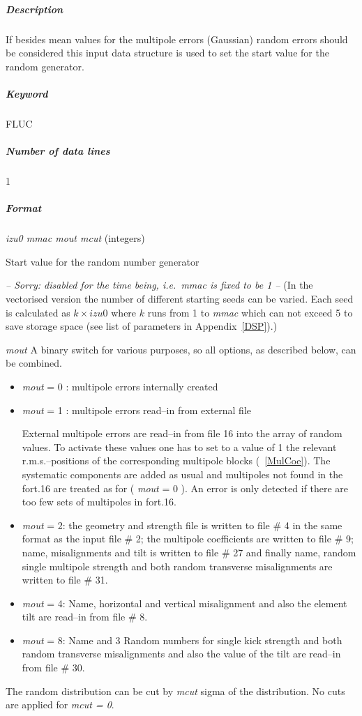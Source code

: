\subparagraph{Description} If besides mean values for the multipole
errors (Gaussian) random errors should be considered this input data
structure is used to set the start value for the random generator.

\subparagraph{Keyword} FLUC \subparagraph{Number of data lines} 1

\subparagraph{Format} {\em izu0 mmac mout mcut} \/(integers)
\begin{description}
\item [izu0] Start value for the random number generator
\item [mmac] {\em \large -- Sorry: disabled for the time being, i.e.\ 
    mmac is fixed to be 1 --} \/({\small In the vectorised version the
    number of different starting seeds can be varied.  Each seed is
    calculated as \mbox{$ k \times izu0 $} where $k$ runs from 1 to
    {\em mmac} \/which can not exceed 5 to save storage space (see
    list of parameters in Appendix~\ref{DSP}).})
\item {\em mout} A binary switch for various purposes, so all options,
  as described below, can be combined. 
\begin{itemize}
\item {\em mout} \/= 0 : multipole errors internally created
\item {\em mout} \/= 1 : multipole errors read--in from external file
  
  External multipole errors are read--in from file 16 into the array
  of random values. To activate these values one has to set to a value
  of 1 the relevant r.m.s.--positions of the corresponding multipole
  blocks (~\ref{MulCoe}). The systematic components are added as usual
  and multipoles not found in the fort.16 are treated as for ({\em
    mout} \/= 0 ). An error is only detected if there are too few sets
  of multipoles in fort.16.
\item {\em mout} \/= 2: the geometry and strength file is written to
  file \# 4 in the same format as the input file \# 2; the multipole
  coefficients are written to file \# 9; name, misalignments and tilt
  is written to file \# 27 and finally name, random single multipole
  strength and both random transverse misalignments are written to
  file \# 31.
\item {\em mout} \/= 4: Name, horizontal and vertical misalignment and
  also the element tilt are read--in from file \# 8.
\item {\em mout} \/= 8: Name and 3 Random numbers for single kick
  strength and both random transverse misalignments and also the value
  of the tilt are read--in from file \# 30. 
\end{itemize}
\item [mcut] The random distribution can be cut by {\em mcut} \/sigma
  of the distribution. No cuts are applied for {\em mcut = 0}\/.
\end{description}

